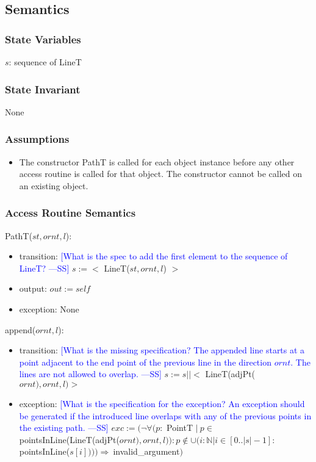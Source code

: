 \documentclass[12pt]{article}
\newcommand{\authornote}[3]{\textcolor{#1}{[#3 ---#2]}}
\newcommand{\authornote}[3]{}
\newcommand{\wss}[1]{\authornote{blue}{SS}{#1}}
\begin{document}
\subsection* {Semantics}

\subsubsection* {State Variables}

$s$: sequence of LineT

\subsubsection* {State Invariant}

None

\subsubsection* {Assumptions}

\begin{itemize}
\item The constructor PathT is called for each object instance before any other
access routine is called for that object.  The constructor cannot be called on
an existing object.
\end{itemize}

\subsubsection* {Access Routine Semantics}

PathT($st, ornt, l$):
\begin{itemize}
\item transition: \wss{What is the spec to add the first element to the sequence
  of LineT?} $s := <$ LineT($st, ornt, l$) $>$
\item output: $out := \mathit{self}$
\item exception: None
\end{itemize}

\noindent append($ornt, l$):
\begin{itemize}
\item transition: \wss{What is the missing specification?  The appended line
    starts at a point adjacent to the end point of the previous line in the
    direction $ornt$.  The lines are not allowed to
    overlap.}  $s := s|| <$ LineT(adjPt($ornt), ornt, l) >$
\item exception: \wss{What is the specification for the exception?  An exception
    should be generated if the introduced line overlaps with any of the previous
    points in the existing path.} $exc := (\neg \forall (p :$ PointT $| \ p \in \ $pointsInLine(LineT(adjPt($ornt),ornt,l)) : p \notin  \cup(i: \mathbb{N} | i \in [0..|s|-1] : \ $pointsInLine($s[i]))) \Rightarrow \ $invalid\_argument$ )$
\end{itemize}
\end{document}
